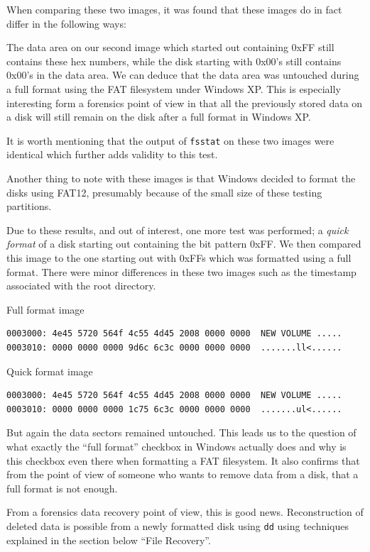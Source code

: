 \documentclass[a4paper,
    11pt,
    normalheadings,
    parindent,
    UKenglish,
    abstracton,
    ]{scrartcl}
\begin{document}
When comparing these two images, it was found that these images do in fact differ in the following ways:

The data area on our second image which started out containing 0xFF still contains these hex numbers, while the disk starting with 0x00's still contains 0x00's in the data area. We can deduce that the data area was untouched during a full format using the FAT filesystem under Windows XP. This is especially interesting form a forensics point of view in that all the previously stored data on a disk will still remain on the disk after a full format in Windows XP.

It is worth mentioning that the output of \texttt{fsstat} on these two images were identical which further adds validity to this test.

Another thing to note with these images is that Windows decided to format the disks using FAT12, presumably because of the small size of these testing partitions.

Due to these results, and out of interest, one more test was performed; a \emph{quick format} of a disk starting out containing the bit pattern 0xFF. We then compared this image to the one starting out with 0xFFs which was formatted using a full format. There were minor differences in these two images such as the timestamp associated with the root directory.

Full format image
\begin{verbatim}
0003000: 4e45 5720 564f 4c55 4d45 2008 0000 0000  NEW VOLUME .....
0003010: 0000 0000 0000 9d6c 6c3c 0000 0000 0000  .......ll<......
\end{verbatim}

Quick format image
\begin{verbatim}
0003000: 4e45 5720 564f 4c55 4d45 2008 0000 0000  NEW VOLUME .....
0003010: 0000 0000 0000 1c75 6c3c 0000 0000 0000  .......ul<......
\end{verbatim}

But again the data sectors remained untouched. This leads us to the question of what exactly the ``full format'' checkbox in Windows actually does and why is this checkbox even there when formatting a FAT filesystem. It also confirms that from the point of view of someone who wants to remove data from a disk, that a full format is not enough.

From a forensics data recovery point of view, this is good news. Reconstruction of deleted data is possible from a newly formatted disk using \texttt{dd} using techniques explained in the section below ``File Recovery''.
\end{document}
